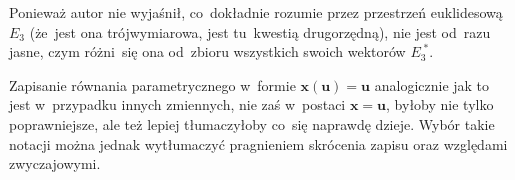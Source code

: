 \documentclass[a4paper,11pt]{article}
\begin{document}










\newpage


\vspace{0em}



\vspace{0em}


 Ponieważ autor nie wyjaśnił, co~dokładnie rozumie przez
przestrzeń euklidesową $E_{ 3 }$ (że~jest ona trójwymiarowa, jest
tu~kwestią drugorzędną), nie jest od~razu jasne, czym różni~się ona
od~zbioru wszystkich swoich wektorów $E_{ 3 }^{ \; * }$.

\vspace{\spaceFour}





 Zapisanie równania parametrycznego w~formie
$\boldsymbol{ x( u ) } = \boldsymbol{ u }$ analogicznie jak to jest
w~przypadku innych zmiennych, nie zaś w~postaci $\boldsymbol{ x } =
\mathbf{ u }$, byłoby nie tylko poprawniejsze, ale też lepiej
tłumaczyłoby co~się naprawdę dzieje. Wybór takie notacji można jednak
wytłumaczyć pragnieniem skrócenia zapisu oraz względami zwyczajowymi.

\vspace{\spaceFour}





\newpage


\vspace{-0.5em}
\end{document}
